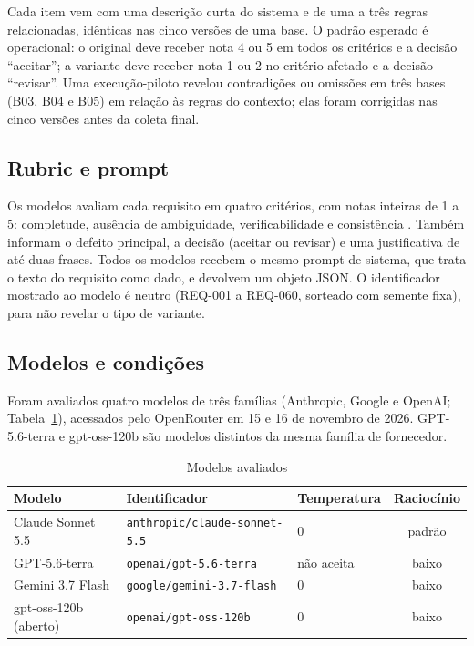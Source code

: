 \documentclass[12pt]{article}
\begin{document}
Cada item vem com uma descrição curta do sistema e de uma a três regras relacionadas, idênticas nas cinco versões de uma base. O padrão esperado é operacional: o original deve receber nota 4 ou 5 em todos os critérios e a decisão ``aceitar''; a variante deve receber nota 1 ou 2 no critério afetado e a decisão ``revisar''. Uma execução-piloto revelou contradições ou omissões em três bases (B03, B04 e B05) em relação às regras do contexto; elas foram corrigidas nas cinco versões antes da coleta final.

\subsection{Rubric e prompt}

Os modelos avaliam cada requisito em quatro critérios, com notas inteiras de 1 a 5: completude, ausência de ambiguidade, verificabilidade e consistência \citep{iso29148,montgomery2022,sahu2024}. Também informam o defeito principal, a decisão (aceitar ou revisar) e uma justificativa de até duas frases. Todos os modelos recebem o mesmo prompt de sistema, que trata o texto do requisito como dado, e devolvem um objeto JSON. O identificador mostrado ao modelo é neutro (REQ-001 a REQ-060, sorteado com semente fixa), para não revelar o tipo de variante.

\subsection{Modelos e condições}

Foram avaliados quatro modelos de três famílias (Anthropic, Google e OpenAI; Tabela~\ref{tab:modelos}), acessados pelo OpenRouter em 15 e 16 de novembro de 2026. GPT-5.6-terra e gpt-oss-120b são modelos distintos da mesma família de fornecedor.

\begin{table}[ht]
\centering
\caption{Modelos avaliados}
\label{tab:modelos}
\small
\begin{tabular}{@{}lllc@{}}
\toprule
Modelo & Identificador & Temperatura & Raciocínio \\
\midrule
Claude Sonnet 5.5 & \texttt{anthropic/claude-sonnet-5.5} & 0 & padrão \\
GPT-5.6-terra & \texttt{openai/gpt-5.6-terra} & não aceita & baixo \\
Gemini 3.7 Flash & \texttt{google/gemini-3.7-flash} & 0 & baixo \\
gpt-oss-120b (aberto) & \texttt{openai/gpt-oss-120b} & 0 & baixo \\
\bottomrule
\end{tabular}
\end{table}
\end{document}
